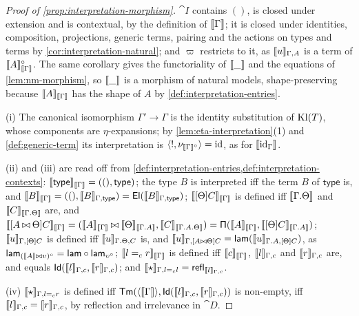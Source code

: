 \begin{proof}[Proof of \cref{prop:interpretation-morphism}]
    $\cat{I}$ contains $()$, is closed under extension and is contextual, by the definition of $\llbracket\Gamma\rrbracket$; it is closed under identities, composition, projections, generic terms, pairing and the actions on types and terms by \cref{cor:interpretation-natural}; and $\varpi$ restricts to it, as $\llbracket u\rrbracket_{\Gamma, A}$ is a term of $\llbracket A\rrbracket_{\llbracket\Gamma\rrbracket}^{\circ}$. The same corollary gives the functoriality of $\llbracket\_\rrbracket$ and the equations of \cref{lem:nm-morphism}, so $\llbracket\_\rrbracket$ is a morphism of natural models, shape-preserving because $\llbracket A\rrbracket_{\llbracket\Gamma\rrbracket}$ has the shape of $A$ by \cref{def:interpretation-entries}.

    (i) The canonical isomorphism $\Gamma' \to \Gamma$ is the identity substitution of $\mathrm{Kl}(T)$, whose components are $\eta$-expansions; by \cref{lem:eta-interpretation}(1) and \cref{def:generic-term} its interpretation is $\langle !, \nu_{\llbracket\Gamma\rrbracket^{\circ}} \rangle = \mathrm{id}$, as for $\llbracket\mathrm{id}_\Gamma\rrbracket$.

    (ii) and (iii) are read off from \cref{def:interpretation-entries,def:interpretation-contexts}: $\llbracket\mathsf{type}\rrbracket_{\llbracket\Gamma\rrbracket} = ((), \mathsf{type})$; the type $B$ is interpreted iff the term $B$ of $\mathsf{type}$ is, and $\llbracket B\rrbracket_{\llbracket\Gamma\rrbracket} = ((), \llbracket B\rrbracket_{\Gamma, \mathsf{type}}) = \mathsf{El}(\llbracket B\rrbracket_{\Gamma, \mathsf{type}})$; $\llbracket[\Theta]C\rrbracket_{\llbracket\Gamma\rrbracket}$ is defined iff $\llbracket\Gamma.\Theta\rrbracket$ and $\llbracket C\rrbracket_{\llbracket\Gamma.\Theta\rrbracket}$ are, and $\llbracket[A \mathbin{\bowtie} \Theta]C\rrbracket_{\llbracket\Gamma\rrbracket} = (\llbracket A\rrbracket_{\llbracket\Gamma\rrbracket} \mathbin{\bowtie} \llbracket\Theta\rrbracket_{\llbracket\Gamma.A\rrbracket}, \llbracket C\rrbracket_{\llbracket\Gamma.A.\Theta\rrbracket}) = \mathsf{\Pi}(\llbracket A\rrbracket_{\llbracket\Gamma\rrbracket}, \llbracket[\Theta]C\rrbracket_{\llbracket\Gamma.A\rrbracket})$; $\llbracket u\rrbracket_{\Gamma, [\Theta]C}$ is defined iff $\llbracket u\rrbracket_{\Gamma.\Theta, C}$ is, and $\llbracket u\rrbracket_{\Gamma, [A \mathbin{\bowtie} \Theta]C} = \mathsf{lam}(\llbracket u\rrbracket_{\Gamma.A, [\Theta]C})$, as $\mathsf{lam}_{(\llbracket A\rrbracket \mathbin{\bowtie} \upsilon)^{\circ}} = \mathsf{lam} \circ \mathsf{lam}_{\upsilon^{\circ}}$; $\llbracket l =_c r\rrbracket_{\llbracket\Gamma\rrbracket}$ is defined iff $\llbracket c\rrbracket_{\llbracket\Gamma\rrbracket}$, $\llbracket l\rrbracket_{\Gamma, c}$ and $\llbracket r\rrbracket_{\Gamma, c}$ are, and equals $\mathsf{Id}(\llbracket l\rrbracket_{\Gamma, c}, \llbracket r\rrbracket_{\Gamma, c})$; and $\llbracket\star\rrbracket_{\Gamma, l =_c l} = \mathsf{refl}_{\llbracket l\rrbracket_{\Gamma, c}}$.

    (iv) $\llbracket\star\rrbracket_{\Gamma, l =_c r}$ is defined iff $\mathsf{Tm}(\langle \llbracket\Gamma\rrbracket \rangle, \mathsf{Id}(\llbracket l\rrbracket_{\Gamma, c}, \llbracket r\rrbracket_{\Gamma, c}))$ is non-empty, iff $\llbracket l\rrbracket_{\Gamma, c} = \llbracket r\rrbracket_{\Gamma, c}$, by reflection and irrelevance in $\cat{D}$.
\end{proof}

